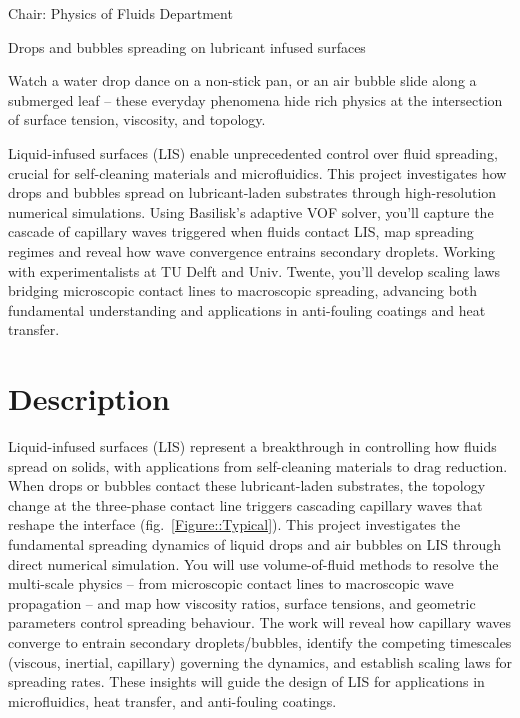 \documentclass[a4paper,10pt]{article}
\begin{document}
\noindent Chair: Physics of Fluids Department

\begin{center}
	\begin{LARGE}
	 Drops and bubbles spreading on lubricant infused surfaces
	\end{LARGE}
\end{center}

\noindent Watch a water drop dance on a non-stick pan, or an air bubble slide along a submerged leaf -- these everyday phenomena hide rich physics at the intersection of surface tension, viscosity, and topology.

\begin{tcolorbox}[colback=mgray,colframe=mpurple,title=TL;DR]
	Liquid-infused surfaces (LIS) enable unprecedented control over fluid spreading, crucial for self-cleaning materials and microfluidics. This project investigates how drops and bubbles spread on lubricant-laden substrates through high-resolution numerical simulations. Using Basilisk's adaptive VOF solver, you'll capture the cascade of capillary waves triggered when fluids contact LIS, map spreading regimes and reveal how wave convergence entrains secondary droplets. Working with experimentalists at TU Delft and Univ. Twente, you'll develop scaling laws bridging microscopic contact lines to macroscopic spreading, advancing both fundamental understanding and applications in anti-fouling coatings and heat transfer.
\end{tcolorbox}

\section*{Description}

Liquid-infused surfaces (LIS) represent a breakthrough in controlling how fluids spread on solids, with applications from self-cleaning materials to drag reduction. 
When drops or bubbles contact these lubricant-laden substrates, the topology change at the three-phase contact line triggers cascading capillary waves that reshape the interface (fig.~\ref{Figure::Typical}). This project investigates the fundamental spreading dynamics of liquid drops and air bubbles on LIS through direct numerical simulation. You will use volume-of-fluid methods to resolve the multi-scale physics -- from microscopic contact lines to macroscopic wave propagation -- and map how viscosity ratios, surface tensions, and geometric parameters control spreading behaviour. The work will reveal how capillary waves converge to entrain secondary droplets/bubbles, identify the competing timescales (viscous, inertial, capillary) governing the dynamics, and establish scaling laws for spreading rates. These insights will guide the design of LIS for applications in microfluidics, heat transfer, and anti-fouling coatings.
\end{document}
